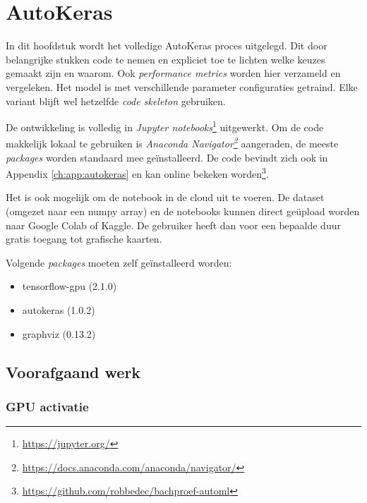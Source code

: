 
\chapter{AutoKeras}
\label{ch:autokeras}

In dit hoofdstuk wordt het volledige AutoKeras proces uitgelegd. Dit door belangrijke stukken code te nemen en expliciet toe te lichten welke keuzes gemaakt zijn en waarom. Ook \textit{performance metrics} worden hier verzameld en vergeleken. Het model is met verschillende parameter configuraties getraind. Elke variant blijft wel hetzelfde \textit{code skeleton} gebruiken.

De ontwikkeling is volledig in \textit{Jupyter notebooks}\footnote{\url{https://jupyter.org/}} uitgewerkt. Om de code makkelijk lokaal te gebruiken is \textit{Anaconda Navigator\footnote{\url{https://docs.anaconda.com/anaconda/navigator/}}} aangeraden, de meeste \textit{packages} worden standaard mee geïnstalleerd. De code bevindt zich ook in Appendix \ref{ch:app:autokeras} en kan online bekeken worden\footnote{\url{https://github.com/robbedec/bachproef-automl}}.

Het is ook mogelijk om de notebook in de cloud uit te voeren. De dataset (omgezet naar een numpy array) en de notebooks kunnen direct geüpload worden naar Google Colab of Kaggle. De gebruiker heeft dan voor een bepaalde duur gratis toegang tot grafische kaarten.

Volgende \textit{packages} moeten zelf geïnstalleerd worden:

\begin{itemize}
    \item tensorflow-gpu (2.1.0)
    \item autokeras (1.0.2)
    \item graphviz (0.13.2)
\end{itemize}

\section{Voorafgaand werk}
\label{sec:autokeras-before}

\subsection{GPU activatie}
\label{subsec:autokeras-gpu}

